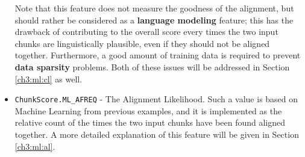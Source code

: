 \begin{itemize}
	Note that this feature does not measure the goodness of the alignment, but should rather be considered as a \textbf{language modeling} feature; this has the drawback of contributing to the overall score every times the two input chunks are linguistically plausible, even if they should not be aligned together. Furthermore, a good amount of training data is required to prevent \textbf{data sparsity} problems. Both of these issues will be addressed in Section \ref{ch3:ml:cl} as well.

	\item \texttt{ChunkScore.ML\_AFREQ} - The Alignment Likelihood. Such a value is based on Machine Learning from previous examples, and it is implemented as the relative count of the times the two input chunks have been found aligned together. A more detailed explanation of this feature will be given in Section \ref{ch3:ml:al}. 
\end{itemize}

